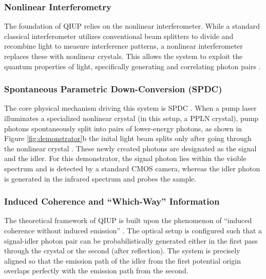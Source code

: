 \documentclass[12pt,a4paper]{article}
\begin{document}
    \subsubsection{Nonlinear Interferometry} 
        The foundation of \ac{QIUP} relies on the nonlinear interferometer. 
        While a standard classical interferometer utilizes conventional beam splitters to divide and recombine light to measure interference patterns, a nonlinear interferometer replaces these with nonlinear crystals. This allows the system to exploit the quantum properties of light, specifically generating and correlating photon pairs \cite{NonlinearInterferometry}.
        \label{sec:nonlinear_interferometer}
    
    \subsubsection{Spontaneous Parametric Down-Conversion (SPDC)}
        The core physical mechanism driving this system is \ac{SPDC} \cite{lemos2014quantum}. 
        When a pump laser illuminates a specialized nonlinear crystal (in this setup, a \ac{PPLN} crystal), pump photons spontaneously split into pairs of lower-energy photons, as shown in Figure \ref{fig:demonstrator}b the inital light beam splits only after going through the nonlinear crystal \cite{NonlinearInterferometry}. These newly created photons are designated as the signal and the idler. For this demonstrator, the signal photon lies within the visible spectrum and is detected by a standard \ac{CMOS} camera, whereas the idler photon is generated in the infrared spectrum and probes the sample.
        \label{sec:SPDC}
    
    \subsubsection{Induced Coherence and ``Which-Way'' Information}
        The theoretical framework of \ac{QIUP} is built upon the phenomenon of ``induced coherence without induced emission'' \cite{lemos2014quantum, NonlinearInterferometry}. The optical setup is configured such that a signal-idler photon pair can be probabilistically generated either in the first pass through the crystal or the second (after reflection). The system is precisely aligned so that the emission path of the idler from the first potential origin overlaps perfectly with the emission path from the second.
        \label{sec:induced_coherence}
\end{document}

